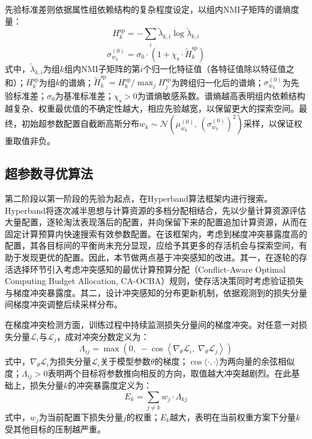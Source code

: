先验标准差则依据属性组依赖结构的复杂程度设定，以组内NMI子矩阵的谱熵度量：
\begin{equation}
  H_{k}^{\mathrm{sp}} = -\sum_{i} \tilde{\lambda}_{k, i} \log \tilde{\lambda}_{k, i}
  \label{eq.popsyn.spectral}
\end{equation}
\begin{equation}
  \sigma_{w_k}^{(0)} = \sigma_{0} \cdot \left(1 + \chi_{\mathrm{s}} \cdot \tilde{H}_{k}^{\mathrm{sp}}\right)
  \label{eq.popsyn.priorsigma}
\end{equation}
式中，$\tilde{\lambda}_{k, i}$为组$k$组内NMI子矩阵的第$i$个归一化特征值（各特征值除以特征值之和）；$H_{k}^{\mathrm{sp}}$为组$k$的谱熵；$\tilde{H}_{k}^{\mathrm{sp}} = H_{k}^{\mathrm{sp}} / \max_{j} H_{j}^{\mathrm{sp}}$为跨组归一化后的谱熵；$\sigma_{w_k}^{(0)}$为先验标准差；$\sigma_{0}$为基准标准差；$\chi_{\mathrm{s}} > 0$为谱熵敏感系数。谱熵越高表明组内依赖结构越复杂、权重最优值的不确定性越大，相应先验越宽，以保留更大的探索空间。最终，初始超参数配置自截断高斯分布$w_k \sim \mathcal{N}\!\left(\mu_{w_k}^{(0)},\, (\sigma_{w_k}^{(0)})^{2}\right)$采样，以保证权重取值非负。
 
\subsection{超参数寻优算法}\label{subsec.popsyn.tuning.hyperband}
 
第二阶段以第一阶段的先验为起点，在Hyperband算法\cite{liHyperbandNovelBanditbased2018}框架内进行搜索。Hyperband将逐次减半思想与计算资源的多档分配相结合，先以少量计算资源评估大量配置，逐轮淘汰表现落后的配置，并向保留下来的配置追加计算资源，从而在固定计算预算内快速搜索有效参数配置。在该框架内，考虑到梯度冲突暴露度高的配置，其各目标间的平衡尚未充分显现，应给予其更多的存活机会与探索空间，有助于发现更优的配置。因此，本节做两点基于冲突感知的改进。其一，在逐轮的存活选择环节引入考虑冲突感知的最优计算预算分配（Conflict-Aware Optimal Computing Budget Allocation, CA-OCBA）规则，使存活决策同时考虑验证损失与梯度冲突暴露度。其二，设计冲突感知的分布更新机制，依据观测到的损失分量间梯度冲突调整后续采样分布。
 
在梯度冲突检测方面，训练过程中持续监测损失分量间的梯度冲突。对任意一对损失分量$\mathcal{L}_{i}$与$\mathcal{L}_{j}$，成对冲突分数定义为：
\begin{equation}
  \Lambda_{ij} = \max\left(0,\; -\cos\!\left\langle \nabla_{\theta} \mathcal{L}_{i},\; \nabla_{\theta} \mathcal{L}_{j} \right\rangle\right)
  \label{eq.popsyn.conflictscore}
\end{equation}
式中，$\nabla_{\theta} \mathcal{L}_{i}$为损失分量$\mathcal{L}_{i}$关于模型参数$\theta$的梯度；$\cos\langle \cdot, \cdot \rangle$为两向量的余弦相似度；$\Lambda_{ij} > 0$表明两个目标将参数推向相反的方向，取值越大冲突越剧烈。在此基础上，损失分量$k$的冲突暴露度定义为：
\begin{equation}
  E_{k} = \sum_{j \neq k} w_{j} \cdot \Lambda_{kj}
  \label{eq.popsyn.exposure}
\end{equation}
式中，$w_{j}$为当前配置下损失分量$j$的权重；$E_{k}$越大，表明在当前权重方案下分量$k$受其他目标的压制越严重。
 
